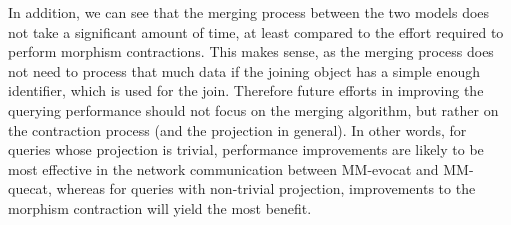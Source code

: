 In addition, we can see that the merging process between the two models does not take a significant amount of time, at least compared to the effort required to perform morphism contractions.
This makes sense, as the merging process does not need to process that much data if the joining object has a simple enough identifier, which is used for the join.
Therefore future efforts in improving the querying performance should not focus on the merging algorithm, but rather on the contraction process (and the projection in general).
In other words, for queries whose projection is trivial, performance improvements are likely to be most effective in the network communication between MM-evocat and MM-quecat, whereas for queries with non-trivial projection, improvements to the morphism contraction will yield the most benefit.
